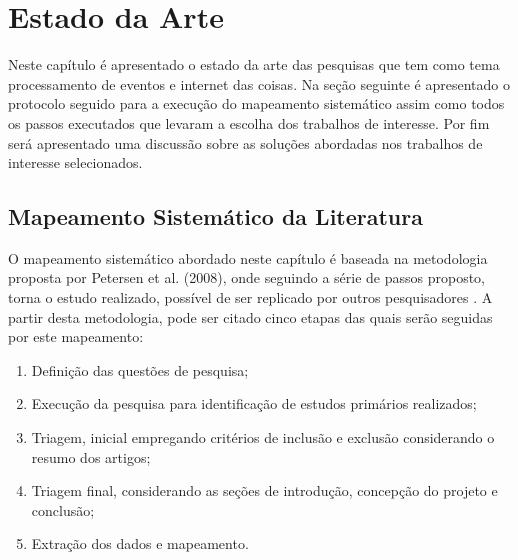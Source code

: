 \documentclass[tid,table]{texufpel} %
\begin{document}


\chapter{Estado da Arte} 
\label{cap:Estado_da_Arte}

Neste capítulo é apresentado o estado da arte das pesquisas que tem como tema processamento de eventos e internet das coisas. Na seção seguinte é apresentado o protocolo seguido para a execução do mapeamento sistemático assim como todos os passos executados que levaram a escolha dos trabalhos de interesse. Por fim será apresentado uma discussão sobre as soluções abordadas nos trabalhos de interesse selecionados.    

\section{Mapeamento Sistemático da Literatura}

O mapeamento sistemático abordado neste capítulo é baseada na metodologia proposta por Petersen et al. (2008), onde seguindo a série de passos proposto, torna o estudo realizado, possível de ser replicado por outros pesquisadores \cite{petersen08}. A partir desta metodologia, pode ser citado cinco etapas das quais serão seguidas por este mapeamento:

\begin{enumerate}
	\item Definição das questões de pesquisa;
	\item Execução da pesquisa para identificação de estudos primários realizados;
	\item Triagem, inicial empregando critérios de inclusão e exclusão considerando o resumo dos artigos;
	\item Triagem final, considerando as seções de introdução, concepção do projeto e conclusão;
	\item Extração dos dados e mapeamento.
	

\end{enumerate}  
\end{document}
